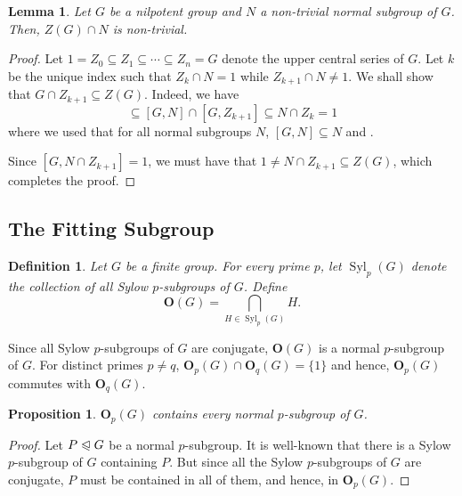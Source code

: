 \documentclass[12pt]{article}
\theoremstyle{thmstyle}
\newtheorem{lemma}[theorem]{Lemma}
\newtheorem{proposition}[theorem]{Proposition}
\theoremstyle{defstyle}
\newtheorem{definition}[theorem]{Definition}
\newcommand{\bfO}{\mathbf{O}}
\newcommand{\Syl}{\operatorname{Syl}}
\newcommand{\noreq}{\trianglelefteqslant}
\begin{document}
\begin{lemma}
    Let $G$ be a nilpotent group and $N$ a non-trivial normal subgroup of $G$. Then, $Z(G)\cap N$ is non-trivial.
\end{lemma}
\begin{proof}
    Let $1 = Z_0\subseteq Z_1\subseteq\cdots\subseteq Z_n = G$ denote the upper central series of $G$. Let $k$ be the unique index such that $Z_k\cap N = 1$ while $Z_{k + 1}\cap N\ne 1$. We shall show that $G\cap Z_{k + 1}\subseteq Z(G)$. Indeed, we have 
    \begin{equation*}
        [G, N\cap Z_{k + 1}]\subseteq [G, N]\cap[G, Z_{k + 1}]\subseteq N\cap Z_{k} = 1
    \end{equation*}
    where we used that for all normal subgroups $N$, $[G,N]\subseteq N$ and . 

    Since $[G, N\cap Z_{k + 1}] = 1$, we must have that $1\ne N\cap Z_{k + 1}\subseteq Z(G)$, which completes the proof.
\end{proof}


\subsection{The Fitting Subgroup}

\begin{definition}
    Let $G$ be a finite group. For every prime $p$, let $\Syl_p(G)$ denote the collection of all Sylow $p$-subgroups of $G$. Define 
    \begin{equation*}
        \bfO(G) = \bigcap_{H\in\Syl_p(G)} H.
    \end{equation*}
\end{definition}

Since all Sylow $p$-subgroups of $G$ are conjugate, $\bfO(G)$ is a normal $p$-subgroup of $G$. For distinct primes $p\ne q$, $\bfO_p(G)\cap\bfO_q(G) = \{1\}$ and hence, $\bfO_p(G)$ commutes with $\bfO_q(G)$.

\begin{proposition}
    $\bfO_p(G)$ contains every normal $p$-subgroup of $G$.
\end{proposition}
\begin{proof}
    Let $P\noreq G$ be a normal $p$-subgroup. It is well-known that there is a Sylow $p$-subgroup of $G$ containing $P$. But since all the Sylow $p$-subgroups of $G$ are conjugate, $P$ must be contained in all of them, and hence, in $\bfO_p(G)$.
\end{proof}
\end{document}
